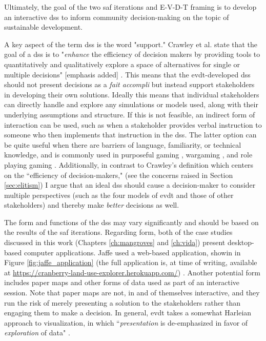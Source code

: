 Ultimately, the goal of the two \ac{saf} iterations and E-V-D-T framing is to develop an interactive \acf{dss} to inform community decision-making on the topic of sustainable development.

A key aspect of the term \ac{dss} is the word "support." Crawley et al. state that the goal of a \ac{dss} is to "\emph{enhance} the efficiency of decision makers by providing tools to quantitatively and qualitatively explore a space of alternatives for single or multiple decisions" [emphasis added] \cite{crawleySystemArchitectureStrategy2015}. This means that the \ac{evdt}-developed \ac{dss} should not present decisions as a \textit{fait accompli} but instead support stakeholders in developing their own solutions. Ideally this means that individual stakeholders can directly handle and explore any simulations or models used, along with their underlying assumptions and structure. If this is not feasible, an indirect form of interaction can be used, such as when a stakeholder provides verbal instruction to someone who then implements that instruction in the \ac{dss}. The latter option can be quite useful when there are barriers of language, familiarity, or technical knowledge, and is commonly used in purposeful gaming \cite{rossGamebasedLearningSystems2014}, wargaming \cite{hansonImprovingOperationalWargaming2016,selvaRevitalizingWargamingNecessary15,shlapakReinforcingDeterrenceNATO2016}, and role playing gaming \cite{groganStrategicEngineeringGaming2012,groganFederatedSimulationGaming2012}. Additionally, in contrast to Crawley's definition which centers on the ``efficiency of decision-makers," (see the concerns raised in Section \ref{sec:elitism}) I argue that an ideal \ac{dss} should cause a decision-maker to consider multiple perspectives (such as the four models of \ac{evdt} and those of other stakeholders) and thereby make \textit{better} decisions as well.

The form and functions of the \ac{dss} may vary significantly and should be based on the results of the \ac{saf} iterations. Regarding form, both of the case studies discussed in this work (Chapters \ref{ch:mangroves} and \ref{ch:vida}) present desktop-based computer applications. Jaffe used a web-based application, showin in Figure \ref{fig:jaffe_application} (the full application is, at time of writing, available at \url{https://cranberry-land-use-explorer.herokuapp.com/}) \cite{jaffeEnvironmentalEconomicSystems2022}. Another potential form includes paper maps and other forms of data used as part of an interactive session. Note that paper maps are not, in and of themselves interactive, and they run the risk of merely presenting a solution to the stakeholders rather than engaging them to make a decision. In general, \ac{evdt} takes a somewhat Harleian approach to visualization, in which ``\textit{presentation} is de-emphasized in favor of \textit{exploration} of data" \cite{cramptonMapsSocialConstructions2001}.

